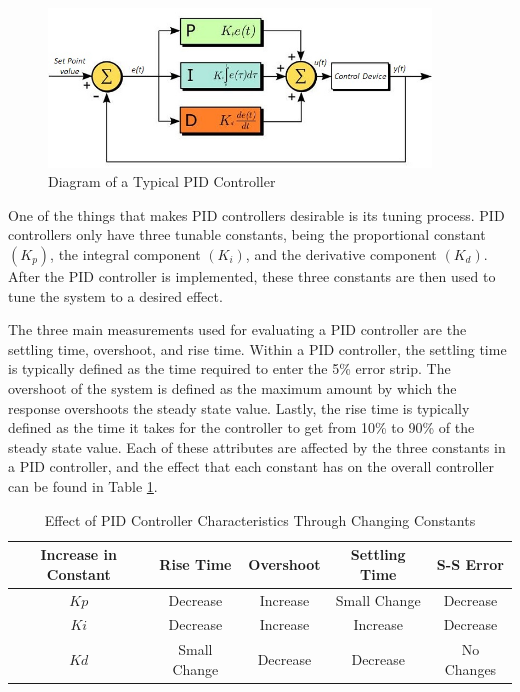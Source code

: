 \documentclass[titlepage,draft]{article}
\begin{document}
{\begin{figure}
	\centering
	\includegraphics[width=4in]{PID2.jpg}
	\caption{Diagram of a Typical PID Controller}
	\label{fig:piddiagram}
\end{figure}

One of the things that makes PID controllers desirable is its tuning process. PID controllers only have three tunable constants, being the proportional constant \((K_p)\), the integral component \((K_i)\), and the derivative component \((K_d)\). After the PID controller is implemented, these three constants are then used to tune the system to a desired effect. \cite{pid_advantages}

The three main measurements used for evaluating a PID controller are the settling time, overshoot, and rise time. Within a PID controller, the settling time is typically defined as the time required to enter the 5\% error strip. The overshoot of the system is defined as the maximum amount by which the response overshoots the steady state value. Lastly, the rise time is typically defined as the time it takes for the controller to get from 10\% to 90\% of the steady state value. Each of these attributes are affected by the three constants in a PID controller, and the effect that each constant has on the overall controller can be found in Table \ref{tab:pidvals}.

\begin{table}[H]
	\centering
	\caption{Effect of PID Controller Characteristics Through Changing Constants \cite{pid_characteristics}}
	\begin{tabular}{|c | c | c | c | c |}
		\hline
		Increase in Constant & Rise Time    & Overshoot & Settling Time & S-S Error  \\ [0.5ex]
		\hline
		\(Kp\)               & Decrease     & Increase  & Small Change  & Decrease   \\
		\hline
		\(Ki\)               & Decrease     & Increase  & Increase      & Decrease   \\
		\hline
		\(Kd\)               & Small Change & Decrease  & Decrease      & No Changes \\
		\hline
	\end{tabular}
	\label{tab:pidvals}
\end{table}

}
\end{document}
